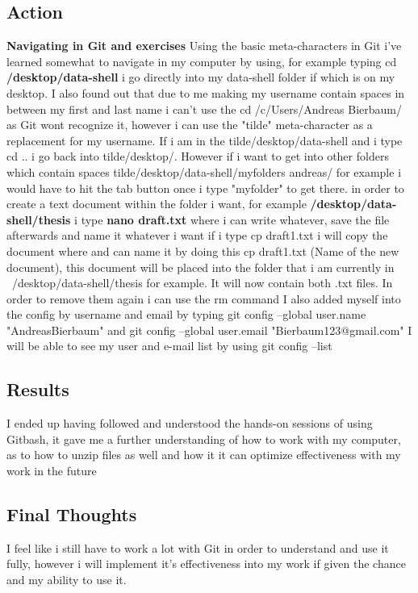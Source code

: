 \documentclass{article}
\begin{document}
\subsection{Action}
\textbf{Navigating in Git and exercises}
Using the basic meta-characters in Git i've learned somewhat to navigate in my computer by using, for example typing cd \textbf{/desktop/data-shell} i go directly into my data-shell folder if which is on my desktop.
I also found out that due to me making my username contain spaces in between my first and last name i can't use the cd /c/Users/Andreas Bierbaum/ as Git wont recognize it, however i can use the "tilde" meta-character as a replacement for my username. If i am in the tilde/desktop/data-shell and i type cd .. i go back into  tilde/desktop/. However if i want to get into other folders which contain spaces tilde/desktop/data-shell/myfolders andreas/ for example i would have to hit the tab button once i type "myfolder" to get there. 
\newline
\newline
in order to create a text document within the folder i want, for example \textbf{/desktop/data-shell/thesis} i type \textbf{nano draft.txt} where i can write whatever, save the file afterwards and name it whatever i want
\newline
\newline
if i type cp draft1.txt i will copy the document where and can name it by doing this cp draft1.txt  (Name of the new document), this document will be placed into the folder that i am currently in ~/desktop/data-shell/thesis for example. It will now contain both .txt files. In order to remove them again i can use the rm command
\newline
\newline
I also added myself into the config by username and email by typing
git config --global user.name "AndreasBierbaum" and git config --global user.email "Bierbaum123@gmail.com"
 I will be able to see my user and e-mail list by using git config --list

\subsection{Results}
I ended up having followed and understood the hands-on sessions of using Gitbash, it gave me a further understanding of how to work with my computer, as to how to unzip files as well and how it it can optimize effectiveness with my work in the future

\subsection{Final Thoughts}
I feel like i still have to work a lot with Git in order to understand and use it fully, however i will implement it's effectiveness into my work if given the chance and my ability to use it.
\newpage
\end{document}
